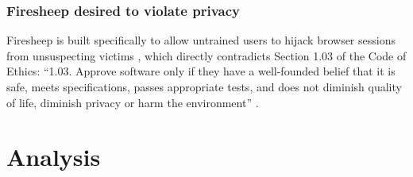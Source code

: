 \documentclass[11pt]{article}
\begin{document}
\begin{multicols}{2}
\subsubsection{Firesheep desired to violate privacy}
Firesheep is built specifically to allow untrained users to hijack browser sessions from unsuspecting victims \cite{eric-butler}, which directly contradicts Section 1.03 of the Code of Ethics: ``1.03. Approve software only if they have a well-founded belief that it is safe, meets specifications, passes appropriate tests, and does not diminish quality of life, diminish privacy or harm the environment'' \cite{se-code}. 



\section{Analysis}


\end{multicols}
\end{document}
